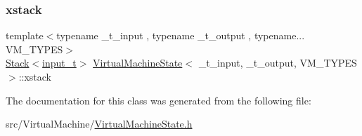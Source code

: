 \mbox{\label{class_virtual_machine_state_a80b006dac38f49c469941d65bdc239fe}} 
\subsubsection{\texorpdfstring{xstack}{xstack}}
{\footnotesize\ttfamily template$<$typename \+\_\+t\+\_\+input , typename \+\_\+t\+\_\+output , typename... V\+M\+\_\+\+T\+Y\+P\+ES$>$ \\
\hyperlink{class_stack}{Stack}$<$\hyperlink{class_virtual_machine_state_a04c5592dddd5b9ffdae5a509d73127dd}{input\+\_\+t}$>$ \hyperlink{class_virtual_machine_state}{Virtual\+Machine\+State}$<$ \+\_\+t\+\_\+input, \+\_\+t\+\_\+output, V\+M\+\_\+\+T\+Y\+P\+ES $>$\+::xstack}



The documentation for this class was generated from the following file\+:\begin{DoxyCompactItemize}
\item 
src/\+Virtual\+Machine/\hyperlink{_virtual_machine_state_8h}{Virtual\+Machine\+State.\+h}\end{DoxyCompactItemize}
